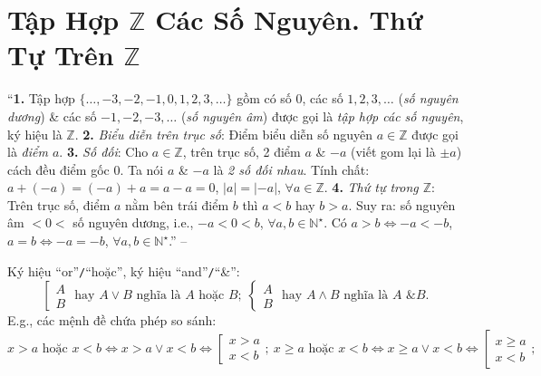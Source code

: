 \documentclass{article}
\numberwithin{equation}{section}
\begin{document}
\section{Tập Hợp $\mathbb{Z}$ Các Số Nguyên. Thứ Tự Trên $\mathbb{Z}$}
``\textbf{1.} Tập hợp $\{\ldots,-3,-2,-1,0,1,2,3,\ldots\}$ gồm có số $0$, các số $1,2,3,\ldots$ (\textit{số nguyên dương}) \& các số $-1,-2,-3,\ldots$ (\textit{số nguyên âm}) được gọi là \textit{tập hợp các số nguyên}, ký hiệu là $\mathbb{Z}$. \textbf{2.} \textit{Biểu diễn trên trục số}: Điểm biểu diễn số nguyên $a\in\mathbb{Z}$ được gọi là \textit{điểm $a$}. \textbf{3.} \textit{Số đối}: Cho $a\in\mathbb{Z}$, trên trục số, 2 điểm $a$ \& $-a$ (viết gom lại là $\pm a$) cách đều điểm gốc $0$. Ta nói $a$ \& $-a$ là \textit{2 số đối nhau}. Tính chất: $a + (-a) = (-a) + a = a - a = 0$, $|a| = |-a|$, $\forall a\in\mathbb{Z}$. \textbf{4.} \textit{Thứ tự trong $\mathbb{Z}$}: Trên trục số, điểm $a$ nằm bên trái điểm $b$ thì $a < b$ hay $b > a$. Suy ra: số nguyên âm $< 0 < $ số nguyên dương, i.e., $-a < 0 < b$, $\forall a,b\in\mathbb{N}^\star$. Có $a > b\Leftrightarrow-a < -b$, $a = b\Leftrightarrow-a = -b$, $\forall a,b\in\mathbb{N}^\star$.'' -- \cite[Chap. II, \S1, p. 35]{Tuyen_Toan_6} 

Ký hiệu ``or''\texttt{/}``hoặc'', ký hiệu ``and''\texttt{/}``\&'':
\begin{equation*}
	\left[\begin{split}
		A\\B
	\end{split}\right.\mbox{ hay } A\lor B\mbox{ nghĩa là $A$ hoặc $B$};\ \left\{\begin{split}
		A\\B
	\end{split}\right.\mbox{ hay } A\land B\mbox{ nghĩa là $A$ \& $B$}.
\end{equation*}
E.g., các mệnh đề chứa phép so sánh:
\begin{equation*}
	x > a \mbox{ hoặc } x < b\Leftrightarrow x > a\lor x < b\Leftrightarrow\left[\begin{split}
		x > a\\x < b
	\end{split}\right.;\ x\ge a \mbox{ hoặc } x < b\Leftrightarrow x\ge a\lor x < b\Leftrightarrow\left[\begin{split}
		x\ge a\\x < b
	\end{split}\right.;
\end{equation*}
\end{document}
